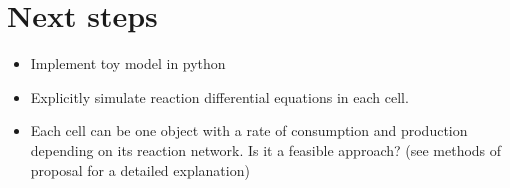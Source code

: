 \documentclass{article}
\begin{document}
	\section{Next steps}
	\begin{itemize}
		\item Implement toy model in python
		\item Explicitly simulate reaction differential equations in each cell.
		\item Each cell can be one object with a rate of consumption and production depending on its reaction network. Is it a feasible approach? (see methods of proposal for a detailed explanation)
	\end{itemize}
\end{document}
